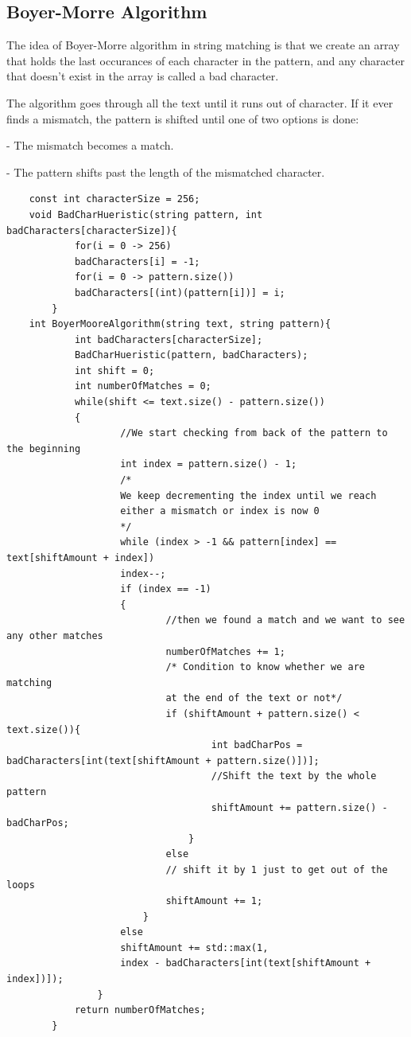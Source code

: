 \documentclass{article}
\theoremstyle{plain}
\begin{document}
\subsection*{Boyer-Morre Algorithm}

The idea of Boyer-Morre algorithm in string matching is that we create an array that holds the last occurances of each character in the pattern, and
any character that doesn't exist in the array is called a bad character.

The algorithm goes through all the text until it runs out of character.
If it ever finds a mismatch, the pattern is shifted until one of two options is done:

- The mismatch becomes a match.

- The pattern shifts past the length of the mismatched character.

\begin{Verbatim}
    const int characterSize = 256;
    void BadCharHueristic(string pattern, int badCharacters[characterSize]){
            for(i = 0 -> 256)
            badCharacters[i] = -1;
            for(i = 0 -> pattern.size())
            badCharacters[(int)(pattern[i])] = i;
        }
    int BoyerMooreAlgorithm(string text, string pattern){
            int badCharacters[characterSize];
            BadCharHueristic(pattern, badCharacters);
            int shift = 0;
            int numberOfMatches = 0;
            while(shift <= text.size() - pattern.size())
            {
                    //We start checking from back of the pattern to the beginning
                    int index = pattern.size() - 1;
                    /*
                    We keep decrementing the index until we reach
                    either a mismatch or index is now 0
                    */
                    while (index > -1 && pattern[index] == text[shiftAmount + index])
                    index--;
                    if (index == -1)
                    {
                            //then we found a match and we want to see any other matches
                            numberOfMatches += 1;
                            /* Condition to know whether we are matching
                            at the end of the text or not*/
                            if (shiftAmount + pattern.size() < text.size()){
                                    int badCharPos = badCharacters[int(text[shiftAmount + pattern.size()])];
                                    //Shift the text by the whole pattern
                                    shiftAmount += pattern.size() - badCharPos;
                                }
                            else
                            // shift it by 1 just to get out of the loops
                            shiftAmount += 1;
                        }
                    else
                    shiftAmount += std::max(1,
                    index - badCharacters[int(text[shiftAmount + index])]);
                }
            return numberOfMatches;
        }
\end{Verbatim}
\newpage
\end{document}
